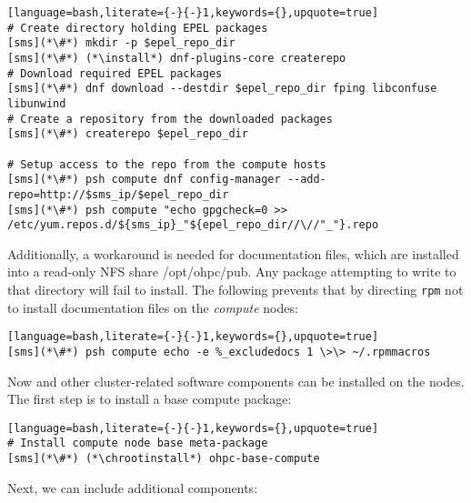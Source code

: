 \begin{lstlisting}[language=bash,literate={-}{-}1,keywords={},upquote=true]
# Create directory holding EPEL packages
[sms](*\#*) mkdir -p $epel_repo_dir
[sms](*\#*) (*\install*) dnf-plugins-core createrepo
# Download required EPEL packages
[sms](*\#*) dnf download --destdir $epel_repo_dir fping libconfuse libunwind
# Create a repository from the downloaded packages
[sms](*\#*) createrepo $epel_repo_dir

# Setup access to the repo from the compute hosts
[sms](*\#*) psh compute dnf config-manager --add-repo=http://$sms_ip/$epel_repo_dir
[sms](*\#*) psh compute "echo gpgcheck=0 >> /etc/yum.repos.d/${sms_ip}_"${epel_repo_dir//\//"_"}.repo
\end{lstlisting}


\noindent Additionally, a workaround is needed for \OHPC{} documentation files,
which are installed into a read-only NFS share /opt/ohpc/pub. Any package
attempting to write to that directory will fail to install. The following
prevents that by directing \texttt{rpm} not to install documentation files on
the {\em compute} nodes:

\begin{lstlisting}[language=bash,literate={-}{-}1,keywords={},upquote=true]
[sms](*\#*) psh compute echo -e %_excludedocs 1 \>\> ~/.rpmmacros
\end{lstlisting}

\noindent Now \OHPC{} and other cluster-related software components can be
installed on the nodes. The first step is to install a base compute package:
\begin{lstlisting}[language=bash,literate={-}{-}1,keywords={},upquote=true]
# Install compute node base meta-package
[sms](*\#*) (*\chrootinstall*) ohpc-base-compute
\end{lstlisting}

\noindent Next, we can include additional components:
